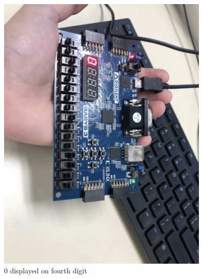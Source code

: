 \documentclass[11pt]{article}
\begin{document}
\begin{figure}[ht]\centering 
	\includegraphics[width= 0.9\textwidth]{b6.png}
	\caption{0 displayed on fourth digit}
	\label{fig: pic6}
\end{figure}
\end{document}
